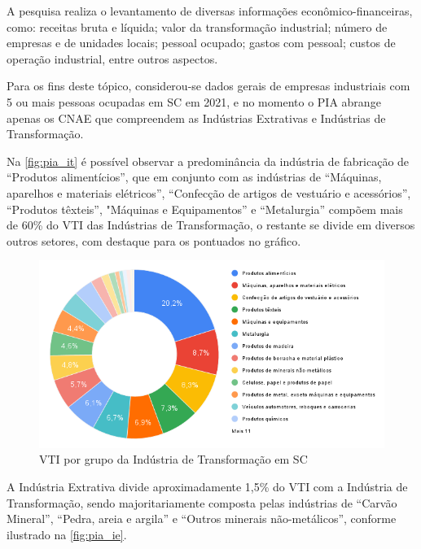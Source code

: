 A pesquisa realiza o levantamento de diversas informações econômico-financeiras, como: receitas bruta e líquida; valor da transformação industrial; número de empresas e de unidades locais; pessoal ocupado; gastos com pessoal; custos de operação industrial, entre outros aspectos. 

Para os fins deste tópico, considerou-se dados gerais de empresas industriais com 5 ou mais pessoas ocupadas em \gls{SC} em 2021, e no momento o \gls{PIA} abrange apenas os \gls{CNAE} que compreendem as Indústrias Extrativas e Indústrias de Transformação.

Na \autoref{fig:pia_it} é possível observar a predominância da indústria de fabricação de “Produtos alimentícios”, que em conjunto com as indústrias de “Máquinas, aparelhos e materiais elétricos”, “Confecção de artigos de vestuário e acessórios”, “Produtos têxteis”, "Máquinas e Equipamentos” e “Metalurgia” compõem mais de 60\% do \gls{VTI} das Indústrias de Transformação, o restante se divide em diversos outros setores, com destaque para os pontuados no gráfico. 

\begin{figure}[ht]
	\caption{\label{fig:pia_it} VTI por grupo da Indústria de Transformação em SC}
	\begin{center}
		\includegraphics[scale=0.5]{images/pia-ibge-2021-it.png}
	\end{center}
\end{figure}

A Indústria Extrativa divide aproximadamente 1,5\% do \gls{VTI} com a Indústria de Transformação, sendo majoritariamente composta pelas indústrias de “Carvão Mineral”, “Pedra, areia e argila” e “Outros minerais não-metálicos”, conforme ilustrado na \autoref{fig:pia_ie}.

